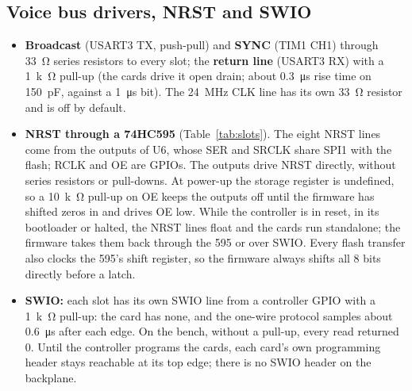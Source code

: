 \documentclass[11pt,a4paper]{article}
\newcommand{\file}[1]{\texttt{#1}}
\begin{document}
\subsection{Voice bus drivers, NRST and SWIO}
\begin{itemize}
  \item \textbf{Broadcast} (USART3 TX, push-pull) and \textbf{SYNC} (TIM1 CH1) through \SI{33}{\ohm} series resistors
    to every slot; the \textbf{return line} (USART3 RX) with a \SI{1}{k\ohm} pull-up (the cards drive it open drain;
    about \SI{0.3}{\micro s} rise time on \SI{150}{pF}, against a \SI{1}{\micro s} bit). The \SI{24}{MHz} CLK line has
    its own \SI{33}{\ohm} resistor and is off by default.
  \item \textbf{NRST through a 74HC595} (Table~\ref{tab:slots}). The eight NRST lines come from the outputs of U6, whose
    SER and SRCLK share SPI1 with the flash; RCLK and OE are GPIOs. The outputs drive NRST directly, without series
    resistors or pull-downs. At power-up the storage register is undefined, so a \SI{10}{k\ohm} pull-up on OE keeps
    the outputs off until the firmware has shifted zeros in and drives OE low. While the controller is in reset, in
    its bootloader or halted, the NRST lines float and the cards run standalone; the firmware takes them back through
    the 595 or over SWIO. Every flash transfer also clocks the 595's shift register, so the firmware always shifts all
    8 bits directly before a latch.
  \item \textbf{SWIO:} each slot has its own SWIO line from a controller GPIO with a \SI{1}{k\ohm} pull-up: the card has
    none, and the one-wire protocol samples about \SI{0.6}{\micro s} after each edge. On the bench, without a pull-up,
    every read returned 0. Until the controller programs the cards, each card's own programming header stays
    reachable at its top edge; there is no SWIO header on the backplane.
\end{itemize}

\begin{table}[htbp]
\centering\small
\caption{Slot lines (generated from \file{hw/backplane.py}).}\label{tab:slots}

\end{table}
\end{document}
